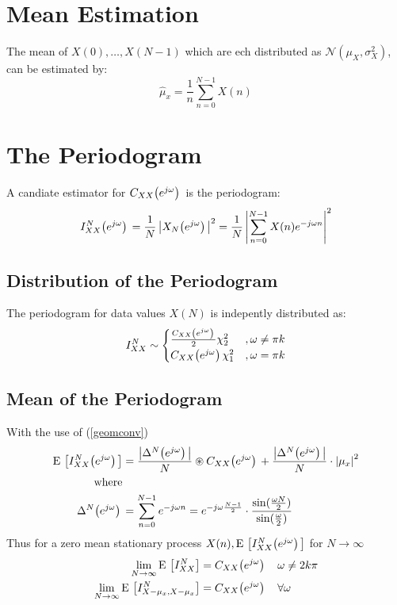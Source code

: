 \documentclass[accentcolor=tud4c,9.5pt,nochapname,bigchapter,paper=a5report]{tudreport}
\begin{document}
\section{Mean Estimation}
The mean of $X(0),\ldots ,X(N-1)$ which are ech distributed as $\mathcal{N}(\mu_X,\sigma_X^2)$, can be estimated by:
\begin{equation}
\hat{{\mu}}_x=\frac{1}{n}\sum\limits_{n=0}^{N-1}X(n)
\end{equation}

\section{The Periodogram}
A candiate estimator for $C_{XX}{\left(e^{j\omega}\right)}\,$ is the periodogram:
\begin{equation}
I_{XX}^{N}{\left(e^{j\omega}\right)}\, = \frac{1}{N}\left|X_N{\left(e^{j\omega}\right)}\,\right|^2 = \frac{1}{N}\left|\sum\limits_{n=0}^{N-1} X(n) e^{-j\omega n}\right|^2
\end{equation}
\subsection{Distribution of the Periodogram}
The periodogram for data values $X(N)$ is indepently distributed as:
\begin{equation}
I_{XX}^{N} \sim \begin{cases}
\frac{C_{XX}{\left(e^{j\omega}\right)}\,}{2}\chi_2^2 &,\omega \neq \pi k \\
C_{XX}{\left(e^{j\omega}\right)}\,\chi_1^2 &,\omega = \pi k \\
\end{cases}
\end{equation}

\subsection{Mean of the Periodogram}
With the use of (\ref{geomconv})
\begin{subequations}
\begin{align}
{\rm E}\,\left[I_{XX}^{N}{\left(e^{j\omega}\right)}\,\right] &= \frac{\left|\Delta^N{\left(e^{j\omega}\right)}\,\right|}{N} \circledast C_{XX}{\left(e^{j\omega}\right)}\, 
+\frac{\left|\Delta^N{\left(e^{j\omega}\right)}\,\right|}{N} \cdot \left|\mu_x\right|^2 \\
\text{where} \notag \\
\Delta^N{\left(e^{j\omega}\right)}\, &= \sum\limits_{n=0}^{N-1}e^{-j\omega n} = e ^{-j \omega \frac{N-1}{2}} \cdot \frac{\sin(\frac{\omega N}{2})}{\sin(\frac{\omega}{2})}
\end{align}
\end{subequations}
Thus for a zero mean stationary process $X(n),{\rm E}\,\left[I_{XX}^{N}{\left(e^{j\omega}\right)}\,\right]$ for $N\rightarrow\infty$
\begin{subequations}
\begin{align}
\lim\limits_{N\rightarrow\infty} {\rm E}\,\left[I_{XX}^{N}\right] &= C_{XX}{\left(e^{j\omega}\right)}\, \quad \omega \neq 2k\pi \\
\lim\limits_{N\rightarrow\infty} {\rm E}\,\left[I_{X-\mu_x,X-\mu_x}^{N}\right] &= C_{XX}{\left(e^{j\omega}\right)}\, \quad \forall\omega
\end{align}
\end{subequations}
\end{document}
